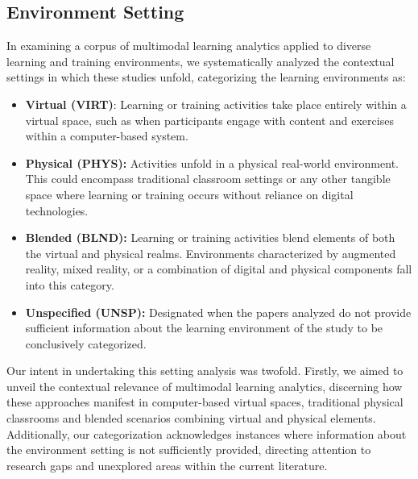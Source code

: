 \documentclass[manuscript,screen,review]{acmart}
\begin{document}
\subsection{Environment Setting} \label{subsec:environment_setting}

In examining a corpus of multimodal learning analytics applied to diverse learning and training environments, we systematically analyzed the contextual settings in which these studies unfold, categorizing the learning environments as: %

\begin{itemize}
    \item \textbf{Virtual (VIRT)}: Learning or training activities take place entirely within a virtual space, such as when participants engage with content and exercises within a computer-based system.  
    \item \textbf{Physical (PHYS):} Activities unfold in a physical real-world environment. This could encompass traditional classroom settings or any other tangible space where learning or training occurs without reliance on digital technologies. 
    \item \textbf{Blended (BLND):} Learning or training activities blend elements of both the virtual and physical realms. Environments characterized by augmented reality, mixed reality, or a combination of digital and physical components fall into this category. 
    \item \textbf{Unspecified (UNSP):} Designated when the papers analyzed do not provide sufficient information about the learning environment of the study to be conclusively categorized.    
\end{itemize}

Our intent in undertaking this setting analysis was twofold. Firstly, we aimed to unveil the contextual relevance of multimodal learning analytics, discerning how these approaches manifest in computer-based virtual spaces, traditional physical classrooms and blended scenarios combining virtual and physical elements. Additionally, our categorization acknowledges instances where information about the environment setting is not sufficiently provided, directing attention to research gaps and unexplored areas within the current literature.
\end{document}
